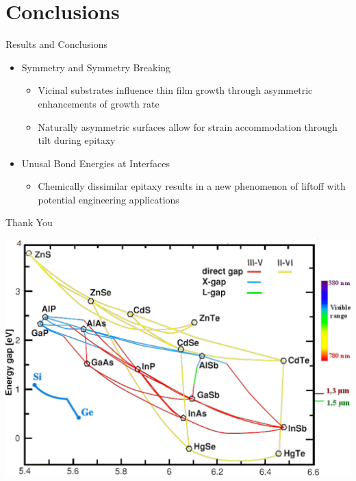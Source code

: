 \documentclass[]{beamer}%
\begin{document}
\section{Conclusions}
\begin{frame}
    \begin{block}{Results and Conclusions}
        \begin{itemize}[<+-| alert@+>]
            \item Symmetry and Symmetry Breaking
            \begin{itemize}
                \item Vicinal substrates influence thin film growth through asymmetric enhancements of growth rate
                \item Naturally asymmetric surfaces allow for strain accommodation through tilt during epitaxy
            \end{itemize}
            \item Unusal Bond Energies at Interfaces
                        \begin{itemize}
                            \item Chemically dissimilar epitaxy results in a new phenomenon of liftoff with potential engineering applications
                        \end{itemize}
        \end{itemize}
    \end{block}
\end{frame}

\begin{frame}
    \begin{center}
            \Huge Thank You
    \end{center}

\end{frame}

\appendix

\begin{frame}
   \includegraphics[width=\textwidth]{graphics/intro_bandgaps}
\end{frame}
\end{document}
